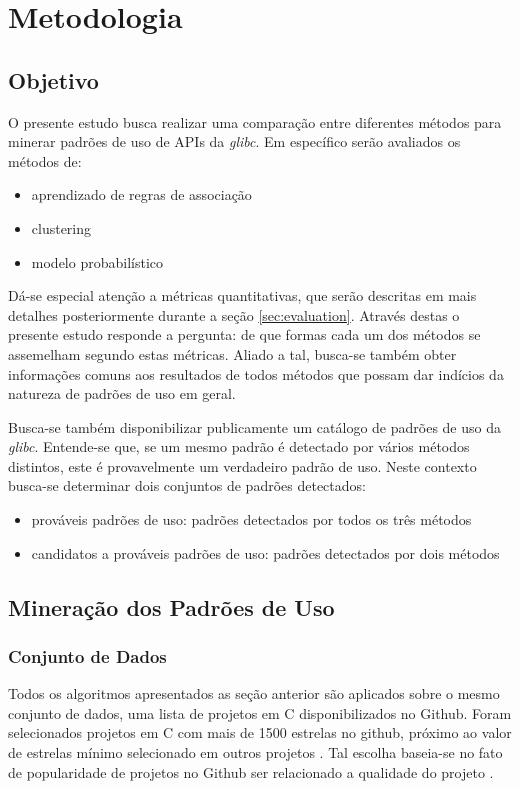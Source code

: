 \section{Metodologia}
\subsection{Objetivo}
O presente estudo busca realizar uma comparação entre diferentes métodos para
minerar padrões de uso de APIs da \textit{glibc}. Em específico serão avaliados
os métodos de:

\begin{itemize}
  \item aprendizado de regras de associação
  \item clustering
  \item modelo probabilístico
\end{itemize}

Dá-se especial atenção a métricas quantitativas, que serão descritas em mais
detalhes posteriormente durante a seção \ref{sec:evaluation}. Através destas o
presente estudo responde a pergunta: de que formas cada um dos métodos se
assemelham segundo estas métricas. Aliado a tal, busca-se também obter
informações comuns aos resultados de todos métodos que possam dar indícios da
natureza de padrões de uso em geral.

Busca-se também disponibilizar publicamente um catálogo de padrões de uso da
\textit{glibc}. Entende-se que, se um mesmo padrão é detectado por vários
métodos distintos, este é provavelmente um verdadeiro padrão de uso. Neste
contexto busca-se determinar dois conjuntos de padrões detectados:
\begin{itemize}
  \item prováveis padrões de uso: padrões detectados por todos os três métodos
  \item candidatos a prováveis padrões de uso: padrões detectados por dois métodos
\end{itemize}

\subsection{Mineração dos Padrões de Uso}

\subsubsection{Conjunto de Dados}
Todos os algoritmos apresentados as seção anterior são aplicados sobre o mesmo
conjunto de dados, uma lista de projetos em C disponibilizados no Github. Foram
selecionados projetos em C com mais de 1500 estrelas no github, próximo ao valor
de estrelas mínimo selecionado em outros projetos \cite{engineered_proj}
\cite{repo_superposition_collaboration}. Tal escolha baseia-se no fato de
popularidade de projetos no Github ser relacionado a qualidade do projeto
\cite{repo_superposition_success} \cite{repo_superposition_collaboration}.


